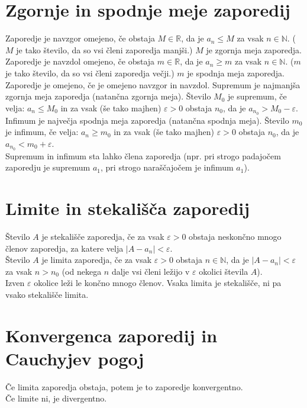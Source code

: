 \documentclass[12pt]{report}
\newcommand{\N}{\mathbb{N}}
\newcommand{\R}{\mathbb{R}}
\begin{document}
\section*{Zgornje in spodnje meje zaporedij}
Zaporedje je navzgor omejeno, če obstaja $M \in \R$, da je $a_{n} \leq M$ za vsak $n\in \N$. ($M$ je tako število, da so vsi členi zaporedja manjši.) $M$ je zgornja meja zaporedja.\\

Zaporedje je navzdol omejeno, če obstaja $m \in \R$, da je $a_{n} \geq m$ za vsak $n\in \N$. ($m$ je tako število, da so vsi členi zaporedja večji.) $m$ je spodnja meja zaporedja.\\
\bigbreak
Zaporedje je omejeno, če je omejeno navzgor in navzdol.
Supremum je najmanjša zgornja meja zaporedja (natančna zgornja meja). Število $M_0$ je supremum, če velja: $a_n \leq M_0$ in za vsak (še tako majhen) $\varepsilon > 0$ obstaja $n_0$, da je $a_{n_0} > M_0 - \varepsilon$. \\
\bigbreak
Infimum je največja spodnja meja zaporedja (natančna spodnja meja). Število $m_0$ je infimum, če velja: $a_n \geq m_0$ in za vsak (še tako majhen) $\varepsilon > 0$ obstaja $n_0$, da je $a_{n_0} < m_0 + \varepsilon$.\\
\bigbreak
Supremum in infimum sta lahko člena zaporedja (npr. pri strogo padajočem zaporedju je supremum $a_1$, pri strogo naraščajočem je infimum $a_1$). 

\section*{Limite in stekališča zaporedij}
Število $A$ je stekališče zaporedja, če za vsak $\varepsilon > 0$ obstaja neskončno mnogo členov zaporedja, za katere velja $|A - a_n| < \varepsilon$.\\
\bigbreak
Število $A$ je limita zaporedja, če za vsak $\varepsilon > 0$ obstaja $n\in \N$, da je $|A - a_n| < \varepsilon$ za vsak $n > n_0$ (od nekega $n$ dalje vsi členi ležijo v $\varepsilon$ okolici števila $A$).\\
\bigbreak
Izven $\varepsilon$ okolice leži le končno mnogo členov.
Vsaka limita je stekališče, ni pa vsako stekališče limita. 

\section*{Konvergenca zaporedij in Cauchyjev pogoj}
Če limita zaporedja obstaja, potem je to zaporedje konvergentno.\\
Če limite ni, je divergentno.\\
\bigbreak
\end{document}
